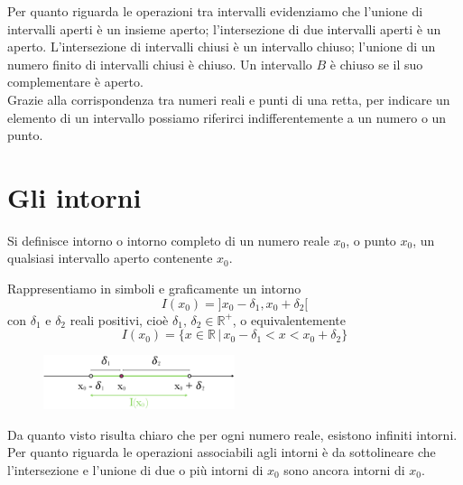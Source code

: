 Per quanto riguarda le operazioni tra intervalli evidenziamo che l'unione di 
intervalli aperti è un insieme aperto; l'intersezione di due intervalli 
aperti è un aperto. L'intersezione di intervalli chiusi è un intervallo 
chiuso; l'unione di un numero finito di intervalli chiusi è chiuso. Un 
intervallo $B$ è chiuso se il suo complementare è aperto.\\

Grazie alla corrispondenza tra numeri reali e punti di una retta, per 
indicare un elemento di un intervallo possiamo riferirci indifferentemente a 
un numero o un punto.

%
%
\section{Gli intorni}
  \begin{definizione}
Si definisce intorno o intorno completo di un numero reale $x_0$, o punto 
$x_0$, un qualsiasi intervallo aperto contenente $x_0$.\\
  \end{definizione}

Rappresentiamo in simboli e graficamente un intorno
\begin{equation}
I(x_0)=]x_0-\delta_1,x_0+\delta_2[
\end{equation}
con $\delta_1$ e $\delta_2$ reali positivi, cioè $\delta_1,\,\delta_2 \in 
\mathbb{R^+}$, o equivalentemente
\begin{equation}
I(x_0)=\{x\in \mathbb{R}\,\vert\,x_0-\delta_1<x<x_0+\delta_2\}
\end{equation}
  \begin{figure}[htpb!]
  \centering
  
\includegraphics[width=0.5\textwidth]{img/top_1.png}%
  \end{figure}
  
Da quanto visto risulta chiaro che per ogni numero reale, esistono infiniti 
intorni.\\
Per quanto riguarda le operazioni associabili agli intorni è da sottolineare 
che l'intersezione e l'unione di due o più intorni di $x_0$ sono ancora 
intorni di $x_0$.\\

